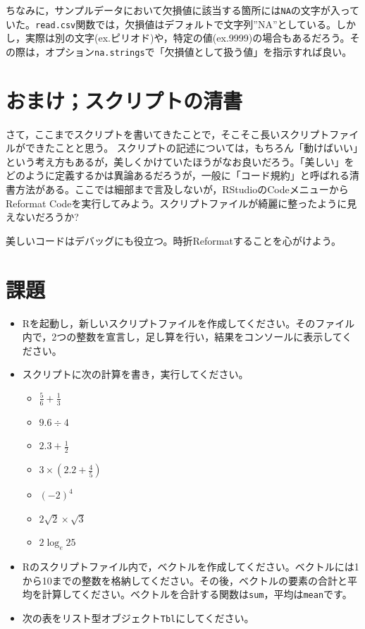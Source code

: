\documentclass[
  a4paper,
]{ltjsbook}
\providecommand{\tightlist}{%
  \setlength{\itemsep}{0pt}\setlength{\parskip}{0pt}}\usepackage{longtable,booktabs,array}
\begin{document}
ちなみに，サンプルデータにおいて欠損値に該当する箇所には\texttt{NA}の文字が入っていた。\texttt{read.csv}関数では，欠損値はデフォルトで文字列''NA''としている。しかし，実際は別の文字(ex.ピリオド)や，特定の値(ex.9999)の場合もあるだろう。その際は，オプション\texttt{na.strings}で「欠損値として扱う値」を指示すれば良い。

\section{おまけ；スクリプトの清書}\label{ux304aux307eux3051ux30b9ux30afux30eaux30d7ux30c8ux306eux6e05ux66f8}

さて，ここまでスクリプトを書いてきたことで，そこそこ長いスクリプトファイルができたことと思う。
スクリプトの記述については，もちろん「動けばいい」という考え方もあるが，美しくかけていたほうがなお良いだろう。「美しい」をどのように定義するかは異論あるだろうが，一般に「コード規約」と呼ばれる清書方法がある。ここでは細部まで言及しないが，RStudioのCodeメニューからReformat
Codeを実行してみよう。スクリプトファイルが綺麗に整ったように見えないだろうか?

美しいコードはデバッグにも役立つ。時折Reformatすることを心がけよう。

\section{課題}\label{ux8ab2ux984c-1}

\begin{itemize}
\item
  Rを起動し，新しいスクリプトファイルを作成してください。そのファイル内で，2つの整数を宣言し，足し算を行い，結果をコンソールに表示してください。
\item
  スクリプトに次の計算を書き，実行してください。

  \begin{itemize}
  \tightlist
  \item
    \(\frac{5}{6} + \frac{1}{3}\)
  \item
    \(9.6 \div 4\)
  \item
    \(2.3 + \frac{1}{2}\)
  \item
    \(3\times (2.2 + \frac{4}{5})\)
  \item
    \((-2)^4\)
  \item
    \(2\sqrt{2} \times \sqrt{3}\)
  \item
    \(2\log_e 25\)
  \end{itemize}
\item
  Rのスクリプトファイル内で，ベクトルを作成してください。ベクトルには1から10までの整数を格納してください。その後，ベクトルの要素の合計と平均を計算してください。ベクトルを合計する関数は\texttt{sum}，平均は\texttt{mean}です。
\item
  次の表をリスト型オブジェクト\texttt{Tbl}にしてください。
\end{itemize}
\end{document}

